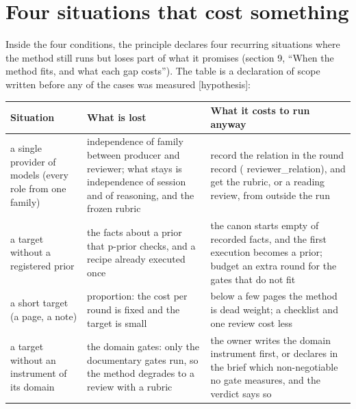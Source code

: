 \documentclass[
  american,
  10pt,
]{report}
\newcounter{none} %
\renewcommand{\texttt}[1]{{\ttfamily\hyphenchar\font=-1 #1}}
\begin{document}
\section{Four situations that cost
something}\label{four-situations-that-cost-something}

Inside the four conditions, the principle declares four recurring
situations where the method still runs but loses part of what it
promises (section 9, ``When the method fits, and what each gap costs'').
The table is a declaration of scope written before any of the cases was
measured \texttt{[hypothesis]}:

{\def\LTcaptype{none} %
\begin{longtable}[]{@{}
  >{\raggedright\arraybackslash}p{}
  >{\raggedright\arraybackslash}p{}
  >{\raggedright\arraybackslash}p{}@{}}
\toprule\noalign{}
\begin{minipage}[b]{\linewidth}\raggedright
Situation
\end{minipage} & \begin{minipage}[b]{\linewidth}\raggedright
What is lost
\end{minipage} & \begin{minipage}[b]{\linewidth}\raggedright
What it costs to run anyway
\end{minipage} \\
\midrule\noalign{}
\endhead
\bottomrule\noalign{}
\endlastfoot
a single provider of models (every role from one family) & independence
of family between producer and reviewer; what stays is independence of
session and of reasoning, and the frozen rubric & record the relation in
the round record (\texttt{reviewer\_\allowbreak{}relation}), and get the
rubric, or a reading review, from outside the run \\
a target without a registered prior & the facts about a prior that
\texttt{p-\allowbreak{}prior} checks, and a recipe already executed once
& the canon starts empty of recorded facts, and the first execution
becomes a prior; budget an extra round for the gates that do not fit \\
a short target (a page, a note) & proportion: the cost per round is
fixed and the target is small & below a few pages the method is dead
weight; a checklist and one review cost less \\
a target without an instrument of its domain & the domain gates: only
the documentary gates run, so the method degrades to a review with a
rubric & the owner writes the domain instrument first, or declares in
the brief which non-negotiable no gate measures, and the verdict says
so \\
\end{longtable}
}
\end{document}
